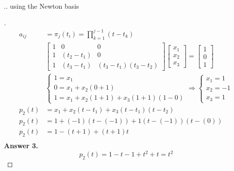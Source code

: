 \documentclass[12pt]{article}
\newenvironment{exercise}[2][Exercise]{\begin{trivlist}
\item[\hskip \labelsep {\bfseries #1}\hskip \labelsep {\bfseries #2.}]}{\end{trivlist}}
\begin{document}
\pagebreak
\begin{exercise}{3}
... using the Newton basis
\end{exercise} \vspace{-10mm}
\begin{proof}[]
	\begin{align*}
		a_{ij} &= \pi_j(t_i) = \prod_{k=1}^{j-1}(t-t_k) \\[10pt]
		& \begin{bmatrix}
			1 & 0 & 0 \\
			1 & (t_2-t_1) & 0 \\
			1 & (t_3-t_1) & (t_3-t_1)(t_3-t_2)	\end{bmatrix}
		\begin{bmatrix}	x_1 \\ x_2 \\ x_3 \end{bmatrix}
		= \begin{bmatrix} 1 \\ 0 \\ 1	\end{bmatrix} \\[10pt]
		& \begin{cases}
			1 = x_1 \\
			0 = x_1 + x_2(0 + 1) \\
			1 = x_1 + x_2(1 + 1) + x_3(1+1)(1-0)
		\end{cases} 
		\Rightarrow \begin{cases} x_1 = 1 \\ x_2 = -1 \\ x_3 = 1 \end{cases}\\[10pt]
		p_{2}(t) &= x_1 + x_2(t - t_1) + x_3(t - t_1)(t - t_2) \\
		p_{2}(t) &= 1 + (-1)(t - (-1)) + 1 (t - (-1))(t - (0)) \\
		p_{2}(t) &= 1 - (t + 1) + (t + 1)t \\
	\end{align*}
	\textbf{Answer 3.} \vspace{-7mm} \\
		\[ p_{2}(t) = 1 - t - 1 + t^2 + t = t^2 \]
\end{proof}
\end{document}
